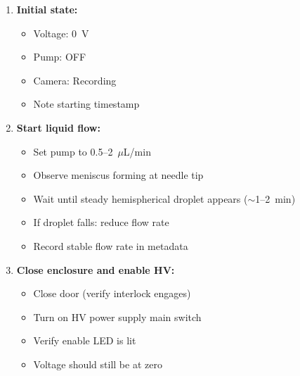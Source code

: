 \documentclass[11pt]{article}
\begin{document}
\begin{enumerate}
\item \textbf{Initial state:}
  \begin{itemize}
  \item Voltage: 0~V
  \item Pump: OFF
  \item Camera: Recording
  \item Note starting timestamp
  \end{itemize}

\item \textbf{Start liquid flow:}
  \begin{itemize}
  \item Set pump to 0.5--2~$\mu$L/min
  \item Observe meniscus forming at needle tip
  \item Wait until steady hemispherical droplet appears ($\sim$1--2~min)
  \item If droplet falls: reduce flow rate
  \item Record stable flow rate in metadata
  \end{itemize}

\item \textbf{Close enclosure and enable HV:}
  \begin{itemize}
  \item Close door (verify interlock engages)
  \item Turn on HV power supply main switch
  \item Verify enable LED is lit
  \item Voltage should still be at zero
  \end{itemize}


\end{enumerate}
\end{document}
